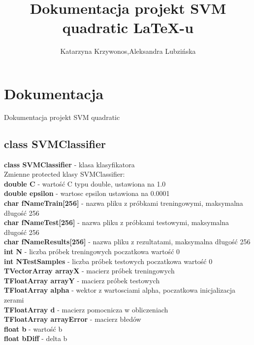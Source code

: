 \documentclass[11pt]{article}
\begin{document}
\title{Dokumentacja projekt SVM quadratic \LaTeX-u}
\author{Katarzyna Krzywonos,Aleksandra Lubzińska}

\section{Dokumentacja}
Dokumentacja projekt SVM quadratic

\subsection{class SVMClassifier}
\textbf{class SVMClassifier} - klasa klasyfikatora\\
Zmienne protected klasy SVMClassifier:\\
\textbf{double C} - wartość C typu double, ustawiona na 1.0\\
\textbf{double epsilon} - wartosc epsilon ustawiona na 0.0001\\
\textbf{char fNameTrain[256]} - nazwa pliku z próbkami treningowymi, maksymalna długość 256\\
\textbf{char fNameTest[256]} - nazwa pliku z próbkami testowymi, maksymalna długość 256\\
\textbf{char fNameResults[256]} - nazwa pliku z rezultatami, maksymalna długość 256\\  
\textbf{int N }- liczba próbek treningowych poczatkowa wartość 0\\
\textbf{int NTestSamples} - liczba próbek testowych poczatkowa wartość 0\\
\textbf{TVectorArray arrayX} - macierz próbek treningowych\\
\textbf{TFloatArray arrayY }- macierz próbek testowych\\
\textbf{TFloatArray alpha} - wektor z wartosciami alpha, poczatkowa inicjalizacja zerami\\
\textbf{TFloatArray d }- macierz pomocnicza w obliczeniach\\
\textbf{TFloatArray arrayError }- macierz błedów \\
\textbf{float b }- wartość b\\
\textbf{float bDiff }- delta b\\
\end{document}
